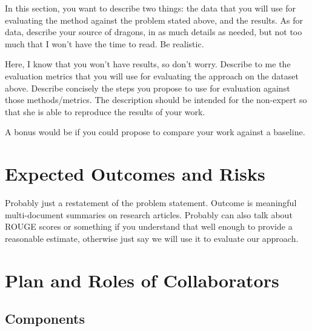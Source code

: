 \documentclass[conference]{sig-alternate-05-2015}
\begin{document}
In this section, you want to describe two things: the data that you will use for evaluating the method against the problem stated above, and the results. As for data, describe your source of dragons, in as much details as needed, but not too much that I won't have the time to read. Be realistic. 

Here, I know that you won't have results, so don't worry. Describe to me the evaluation metrics that you will use for evaluating the approach on the dataset above. Describe concisely the steps you propose to use for evaluation against those methods/metrics. The description should be intended for the non-expert so that she is able to reproduce the results of your work. 

A bonus would be if you could propose to compare your work against a baseline. 

\section{Expected Outcomes and Risks}

Probably just a restatement of the problem statement. Outcome is meaningful multi-document summaries on research articles. Probably can also talk about ROUGE scores or something if you understand that well enough to provide a reasonable estimate, otherwise just say we will use it to evaluate our approach.



\section{Plan and Roles of Collaborators}


\subsection{Components}

\end{document}
